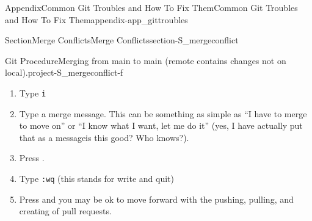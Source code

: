 \documentclass[oneside,10pt,]{book}
\newcommand{\mono}[1]{\texttt{#1}}
\newcommand{\kbd}[1]{\keys{{#1}}}
\begin{document}
\begin{appendixptx}{Appendix}{Common Git Troubles and How To Fix Them}{}{Common Git Troubles and How To Fix Them}{}{}{appendix-app_gittroubles}
\begin{sectionptx}{Section}{Merge Conflicts}{}{Merge Conflicts}{}{}{section-S_mergeconflict}
\begin{project}{Git Procedure}{Merging from main to main (remote contains changes not on local).}{project-S_mergeconflict-f}
\begin{enumerate}[font=\bfseries,label=(\alph*),ref=\alph*]%
\item{}Type \mono{i}%
\item{}Type a merge message. This can be something as simple as ``I have to merge to move on'' or ``I know what I want, let me do it'' (yes, I have actually put that as a message\textellipsis{}is this good? Who knows?).%
\item{}Press \kbd{esc}.%
\item{}Type \mono{:wq} (this stands for write and quit)%
\item{}Press \kbd{Enter} and you may be ok to move forward with the pushing, pulling, and creating of pull requests.%
\end{enumerate}%
\end{project}%
\end{sectionptx}
\end{appendixptx}
%
%
\typeout{************************************************}
\typeout{************************************************}
%
\end{document}
